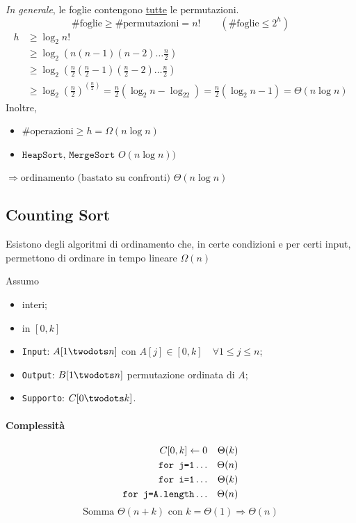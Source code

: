 \emph{In generale}, le foglie contengono \underline{tutte} le permutazioni.
$$ \text{\# foglie} \geq \text{\# permutazioni} = n! \qquad ( \text{\# foglie} \leq 2^h)$$
\begin{align*}
    h & \geq \log_2 n! \\
    & \geq \log_2 \left( n(n-1)(n-2) \dots \frac{n}{2}\right) \\
    & \geq \log_2 \left( \frac{n}{2}\left(\frac{n}{2}-1\right)\left(\frac{n}{2}-2\right) \dots \frac{n}{2}\right) \\
    & \geq \log_2 \left( \frac{n}{2} \right)^{(\frac{n}{2})} 
        = \frac{n}{2} \left( \log_2 n - \log_22\right)
        = \frac{n}{2} (\log_2 n - 1) = \Theta (n \log n)
\end{align*}
Inoltre,
\begin{itemize}
	\item $ \text{\# operazioni} \geq h = \Omega (n \log n)$
	\item $ \texttt{HeapSort, MergeSort } O(n \log n))$ 
\end{itemize}
$\Rightarrow \text{ordinamento (bastato su confronti) } \Theta (n \log n)$

\subsection{Counting Sort}
Esistono degli algoritmi di ordinamento che, in certe condizioni e per certi input, permettono
di ordinare in tempo lineare $\Omega (n)$
\bigskip

Assumo
\begin{itemize}[label=$-$]
    \item interi;
    \item in $[0,k]$
\end{itemize}

\begin{itemize}[label=]
    \item \texttt{Input}: $A[1\twodots n]$ con $A[j] \in [0,k] \quad \forall 1 \leq j \leq n$;
    \item \texttt{Output}: $B[1\twodots n]$ permutazione ordinata di $A$;
    \item \texttt{Supporto}: $C[0\twodots k]$.
\end{itemize}

 

\paragraph{Complessità} 
\begin{align*}
    C[0,k] \leftarrow 0 && \Theta(k) \\
    \text{\texttt{for j=1}} \dots && \Theta(n) \\
    \text{\texttt{for i=1}} \dots && \Theta(k) \\
    \text{\texttt{for j=A.length}} \dots && \Theta(n)
\end{align*}
$$\text{Somma } \Theta(n+k) \text{ con } k = \Theta(1) \Rightarrow \Theta(n)$$

